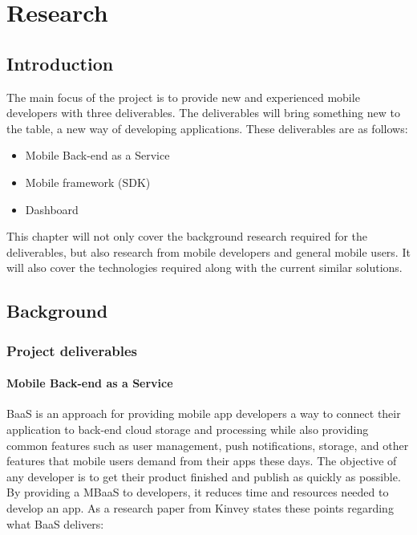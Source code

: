 \chapter{Research}

\label{ch:background}

\section{Introduction}

The main focus of the project is to provide new and experienced mobile developers with three deliverables. The deliverables will bring something new to the table, a new way of developing applications. These deliverables are as follows:

\begin{itemize}
  \item Mobile Back-end as a Service
  \item Mobile framework (SDK)
  \item Dashboard
\end{itemize}

This chapter will not only cover the background research required for the deliverables, but also research from mobile developers and general mobile users. It will also cover the technologies required along with the current similar solutions.

\section{Background}

\subsection{Project deliverables}

\subsubsection{Mobile Back-end as a Service}

BaaS is an approach for providing mobile app developers a way to connect their application to back-end cloud storage and processing while also providing common features such as user management, push notifications, storage, and other  features that mobile users demand from their apps these days. The objective of any developer is to get their product finished and publish as quickly as possible. By providing a MBaaS to developers, it reduces time and resources needed to develop an app. As a research paper from Kinvey \cite{kinveywebsite} states these points regarding what BaaS delivers:

